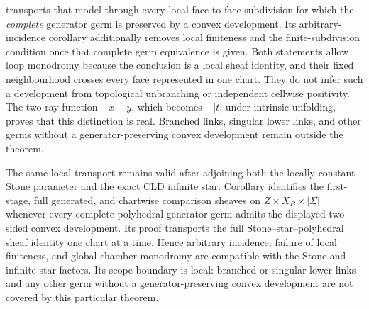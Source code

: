 \begin{remark}
 transports
that model through every local face-to-face subdivision for which the
\emph{complete} generator germ is preserved by a convex development.  Its
arbitrary-incidence corollary additionally removes local finiteness and the
finite-subdivision condition once that complete germ equivalence is given.
Both statements allow loop monodromy because the conclusion is a local sheaf
identity, and their fixed neighbourhood crosses every face represented in
one chart.  They do not infer such a development from topological
unbranching or independent cellwise positivity.  The two-ray function
$-x-y$, which becomes $-|t|$ under intrinsic unfolding, proves that
this distinction is real.  Branched links, singular lower links, and other
germs without a generator-preserving convex development remain outside the
theorem.

The same local transport remains valid after adjoining both the locally
constant Stone parameter and the exact CLD infinite star.  Corollary
 identifies the
first-stage, full generated, and chartwise comparison sheaves on
$Z\times X_B\times|\Sigma|$ whenever every complete polyhedral generator
germ admits the displayed two-sided convex development.  Its proof
transports the full Stone--star--polyhedral sheaf identity one chart at a
time.  Hence arbitrary incidence, failure of local finiteness, and global
chamber monodromy are compatible with the Stone and infinite-star factors.
Its scope boundary is local: branched or singular lower links and any other
germ without a generator-preserving convex development are not covered by
this particular theorem.


\end{remark}
